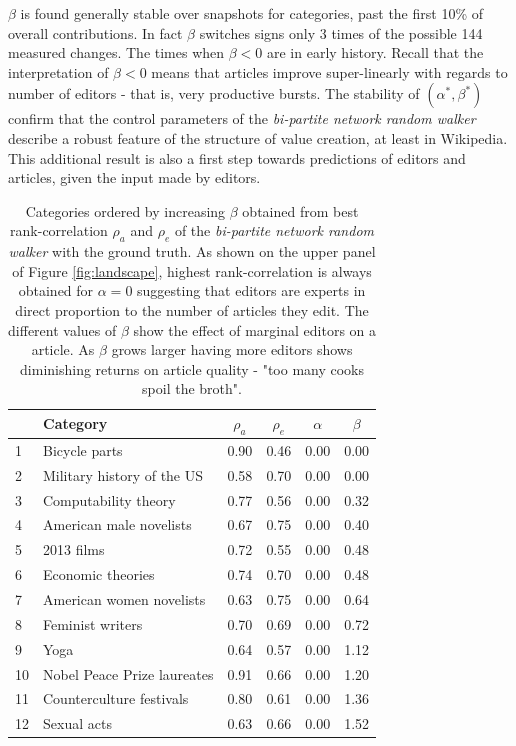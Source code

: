 $\beta$ is found generally stable over snapshots for categories, past the first 10\% of overall contributions. In fact $\beta$ switches signs only 3 times of the possible 144 measured changes. The times when $\beta < 0$ are in early history. Recall that the interpretation of $\beta < 0$ means that articles improve super-linearly with regards to number of editors - that is, very productive bursts. The stability of $(\alpha^*,\beta^*)$ confirm that the control parameters of the {\it bi-partite network random walker} describe a robust feature of the structure of value creation, at least in Wikipedia. This additional result is also a first step towards predictions of editors and articles, given the input made by editors.


\begin{table}
\begin{tabular}{|llcccc|}
\hline
         &                     Category & $\rho_a$ & $\rho_e$ & $\alpha$ & $\beta$ \\
\hline
 1&                        Bicycle parts  &     0.90 &     0.46 &     0.00 &    0.00 \\
 2&Military history of the US  &     0.58 &     0.70 &     0.00 &    0.00 \\
  3&                Computability theory &     0.77 &     0.56 &     0.00 &    0.32 \\
   4&            American male novelists &     0.67 &     0.75 &     0.00 &    0.40 \\
    5&                        2013 films  &     0.72 &     0.55 &     0.00 &    0.48 \\
     6&                Economic theories  &     0.74 &     0.70 &     0.00 &    0.48 \\
     7&         American women novelists  &     0.63 &     0.75 &     0.00 &    0.64 \\
     8&                 Feminist writers  &     0.70 &     0.69 &     0.00 &    0.72 \\
     9&                             Yoga  &     0.64 &     0.57 &     0.00 &    1.12 \\
     10&      Nobel Peace Prize laureates  &     0.91 &     0.66 &     0.00 &    1.20 \\
      11&        Counterculture festivals  &     0.80 &     0.61 &     0.00 &    1.36 \\
        12&                   Sexual acts  &     0.63 &     0.66 &     0.00 &    1.52 \\
\hline
\end{tabular}
\caption{Categories ordered by increasing $\beta$ obtained from best rank-correlation $\rho_a$ and  $\rho_e$
 of the {\it bi-partite network random walker} with the ground truth. As shown on the upper panel of Figure \ref{fig:landscape}, highest rank-correlation is always obtained for $\alpha = 0$ suggesting that editors are experts in direct proportion to the number of articles they edit. The different values of $\beta$ show the effect of marginal editors on a article. As $\beta$ grows larger having more editors shows diminishing returns on article quality - "too many cooks spoil the broth".}
\label{tab:maxbeta}
\end{table}


